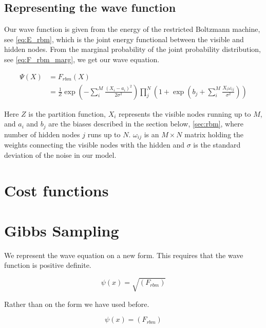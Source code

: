 \subsection{Representing the wave function}

Our wave function is given from the energy of the restricted Boltzmann machine, see \eqref{eq:E_rbm}, which is the joint energy functional between the visible and hidden nodes. From the marginal probability of the joint probability distribution, see \eqref{eq:F_rbm_marg}, we get our wave equation.                     

\begin{align}\label{eq:F_rbm}
\Psi(X) &= F_{rbm}(X) \\
&= \frac{1}{Z} \exp \left( -\sum_{i}^{M} \frac{(X_i - a_i)^2}{2 \sigma^2} \right) \prod_{j}^{N} \left( 1 + \exp \left( b_j + \sum_{i}^{M} \frac{X_i \omega_{ij}}{\sigma^2} \right) \right)
\end{align}

Here $Z$ is the partition function, $X_i$ represents the visible nodes running up to $M$, and $a_i$ and $b_j$ are the biases described in the section below, \eqref{sec:rbm}, where number of hidden nodes $j$ runs up to $N$. 
$\omega_{ij}$ is an $M \times N$ matrix holding the weights connecting the visible nodes with the hidden and $\sigma$ is the standard deviation of the noise in our model. \\


\section{Cost functions}

\section{Gibbs Sampling}

We represent the wave equation on a new form. This requires that the wave function is positive definite. 

\begin{equation}\label{eq:Gibbs}
\psi(x) = \sqrt{(F_{rbm})}
\end{equation}

Rather than on the form we have used before.

\begin{equation}\label{eq:Gibbs_new}
\psi(x) = (F_{rbm})
\end{equation}